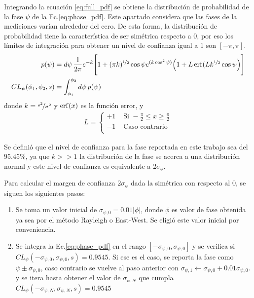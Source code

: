 Integrando la ecuación \ref{eq:full_pdf} se obtiene la distribución de probabilidad de la fase $\psi$ de la Ec.\ref{eq:phase_pdf}. Este apartado considera que las fases de la mediciones varían alrededor del cero. De esta forma, la distribución de probabilidad tiene la característica  de ser simétrica respecto a 0, por eso los límites de integración para obtener un nivel de confianza igual a 1 son $[-\pi, \pi]$.
\begin{align}
    p(\psi) &=d\psi\,\frac{1}{2\pi}e^{-k} \Bigg[ 1 + (\pi k)^{\nicefrac{1}{2}} \cos\psi e^{(k\cos^2\psi)} \Big( 1 + L \erf(L k^{\nicefrac{1}{2}} \cos\psi \Big) \Bigg ] \\ \label{eq:phase_pdf}
    CL_{\psi}(\phi_1, \phi_2, s) &= \int_{\phi_1}^{\phi_2} d\psi \, p(\psi)
\end{align}  
donde $k =\nicefrac{s^2}{\sigma^2}$ y $\erf (x)$ es la función error, y
\begin{align*}
    L =
    \begin{cases} 
        +1 & \text{ Si } -\frac{\pi}{2} \leq x\geq \frac{\pi}{2} \\
        -1 & \text{ Caso contrario }  \\
     \end{cases}
\end{align*}


Se definió que el nivel de confianza para la fase reportada en este trabajo sea del $95.45\%$, ya que $k>>1$ la distribución de la fase se acerca a una distribución normal y este nivel de confianza es equivalente a $2\sigma_\phi$. 

Para calcular el margen de confianza $2\sigma_\psi$  dada la simétrica  con respecto al 0, se siguen los siguientes  pasos:

\begin{enumerate}
    \item Se toma un valor inicial de $\sigma_{\psi,0}=0.01|\phi|$, donde  $\phi$ es valor de fase obtenida ya sea por el método Rayleigh o East-West. Se eligió este valor inicial por conveniencia.
    \item Se integra la Ec.\ref{eq:phase_pdf} en el rango $[-\sigma_{\psi,0}, \sigma_{\psi,0}]$ y se verifica si $CL_{\psi}(-\sigma_{\psi,0}, \sigma_{\psi,0},s) = 0.9545$.  Si ese es el caso, se reporta la fase como $\psi \pm \sigma_{\psi,0}$, caso contrario se vuelve al paso anterior con $\sigma_{\psi,1} \leftarrow \sigma_{\psi,0} + 0.01\sigma_{\psi,0}$. \label{paso2} y se itera hasta obtener el valor de $\sigma_{\psi,N}$ que cumpla $CL_{\psi}(-\sigma_{\psi,N}, \sigma_{\psi,N},s) = 0.9545$
\end{enumerate}

